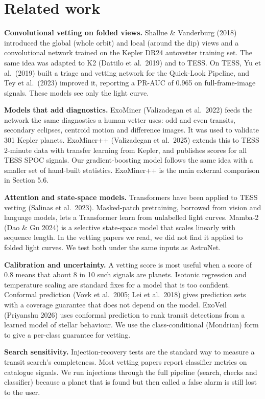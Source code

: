 \documentclass[fleqn,usenatbib]{mnras}
\begin{document}
\section{Related work}

\textbf{Convolutional vetting on folded views.} Shallue \& Vanderburg (2018) introduced the global (whole orbit) and local (around the dip) views and a convolutional network trained on the Kepler DR24 autovetter training set. The same idea was adapted to K2 (Dattilo et al.~2019) and to TESS. On TESS, Yu et al.~(2019) built a triage and vetting network for the Quick-Look Pipeline, and Tey et al.~(2023) improved it, reporting a PR-AUC of 0.965 on full-frame-image signals. These models see only the light curve.

\textbf{Models that add diagnostics.} ExoMiner (Valizadegan et al.~2022) feeds the network the same diagnostics a human vetter uses: odd and even transits, secondary eclipses, centroid motion and difference images. It was used to validate 301 Kepler planets. ExoMiner++ (Valizadegan et al.~2025) extends this to TESS 2-minute data with transfer learning from Kepler, and publishes scores for all TESS SPOC signals. Our gradient-boosting model follows the same idea with a smaller set of hand-built statistics. ExoMiner++ is the main external comparison in Section 5.6.

\textbf{Attention and state-space models.} Transformers have been applied to TESS vetting (Salinas et al.~2023). Masked-patch pretraining, borrowed from vision and language models, lets a Transformer learn from unlabelled light curves. Mamba-2 (Dao \& Gu 2024) is a selective state-space model that scales linearly with sequence length. In the vetting papers we read, we did not find it applied to folded light curves. We test both under the same inputs as AstroNet.

\textbf{Calibration and uncertainty.} A vetting score is most useful when a score of 0.8 means that about 8 in 10 such signals are planets. Isotonic regression and temperature scaling are standard fixes for a model that is too confident. Conformal prediction (Vovk et al.~2005; Lei et al.~2018) gives prediction sets with a coverage guarantee that does not depend on the model. ExoVeil (Priyanshu 2026) uses conformal prediction to rank transit detections from a learned model of stellar behaviour. We use the class-conditional (Mondrian) form to give a per-class guarantee for vetting.

\textbf{Search sensitivity.} Injection-recovery tests are the standard way to measure a transit search's completeness. Most vetting papers report classifier metrics on catalogue signals. We run injections through the full pipeline (search, checks and classifier) because a planet that is found but then called a false alarm is still lost to the user.
\end{document}
